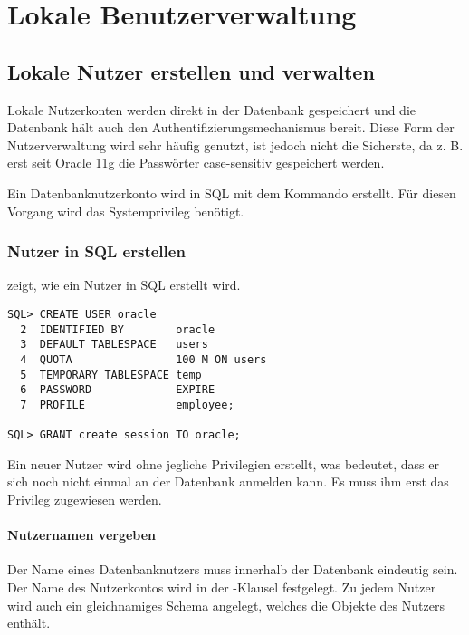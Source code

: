 \chapter{Lokale Benutzerverwaltung}
\chaptertoc{}
\cleardoubleevenpage

    \section{Lokale Nutzer erstellen und verwalten}
      Lokale Nutzerkonten werden direkt in der Datenbank gespeichert und die Datenbank hält auch den Authentifizierungsmechanismus bereit. Diese Form der Nutzerverwaltung wird sehr häufig genutzt, ist jedoch nicht die Sicherste, da z. B. erst seit Oracle 11g die Passwörter case-sensitiv gespeichert werden.

      Ein Datenbanknutzerkonto wird in SQL mit dem Kommando  erstellt. Für diesen Vorgang wird das Systemprivileg  benötigt.
      \subsection{Nutzer in SQL erstellen}
        \label{createuser}
         zeigt, wie ein Nutzer in SQL erstellt wird.
        \begin{lstlisting}[caption={Das CREATE USER
        Statement},label=admin200,language=oracle_sql]
SQL> CREATE USER oracle 
  2  IDENTIFIED BY        oracle
  3  DEFAULT TABLESPACE   users
  4  QUOTA                100 M ON users
  5  TEMPORARY TABLESPACE temp
  6  PASSWORD             EXPIRE
  7  PROFILE              employee;

SQL> GRANT create session TO oracle;
        \end{lstlisting}
        \begin{merke}
          Ein neuer Nutzer wird ohne jegliche Privilegien erstellt, was bedeutet, dass er sich noch nicht einmal an der Datenbank anmelden kann. Es muss ihm erst das  Privileg zugewiesen werden.
        \end{merke}
        \subsubsection{Nutzernamen vergeben}
          Der Name eines Datenbanknutzers muss innerhalb der Datenbank eindeutig sein. Der Name des Nutzerkontos wird in der -Klausel festgelegt. Zu jedem Nutzer wird auch ein gleichnamiges Schema angelegt, welches die Objekte des Nutzers enthält.

